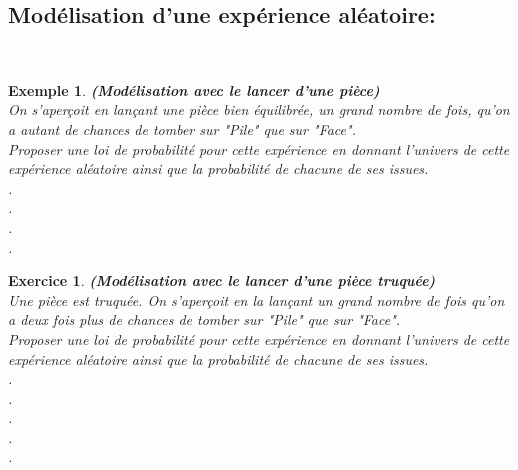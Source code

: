 \documentclass[a4paper,10.5pt]{article}
\newtheorem{defi}{Définition}
\newtheorem{ex}{Exemple}
\newtheorem{exer}{Exercice}
\begin{document}
\subsection{Modélisation d'une expérience aléatoire:}

\noindent{}
\hfill\\
\begin{ex}
	\textbf{(Modélisation avec le lancer d'une pièce)}\\[0.25cm]
On s'aperçoit en lançant une pièce bien équilibrée, un grand nombre de fois, qu'on a autant de chances de tomber sur "Pile" que sur "Face".\\
	Proposer une loi de probabilité pour cette expérience en donnant l'univers de cette expérience aléatoire ainsi que la probabilité de chacune de ses issues.\\[0.5cm]
	.\dotfill \\[0.5cm]
	.\dotfill \\[0.5cm]
	.\dotfill \\[0.5cm]
	.\dotfill \\[0.5cm] 
\end{ex}
\medskip
\begin{exer}
	\textbf{(Modélisation avec le lancer d'une pièce truquée)}\\[0.25cm]
	Une pièce est truquée. On s'aperçoit en la lançant un grand nombre de fois qu'on a deux fois plus de chances de tomber sur "Pile" que sur "Face".\\
	Proposer une loi de probabilité pour cette expérience en donnant l'univers de cette expérience aléatoire ainsi que la probabilité de chacune de ses issues.\\[0.5cm]
	.\dotfill \\[0.5cm]
	.\dotfill \\[0.5cm]
	.\dotfill \\[0.5cm]
	 .\dotfill \\[0.5cm].\dotfill \\ 
\end{exer}
\end{document}
